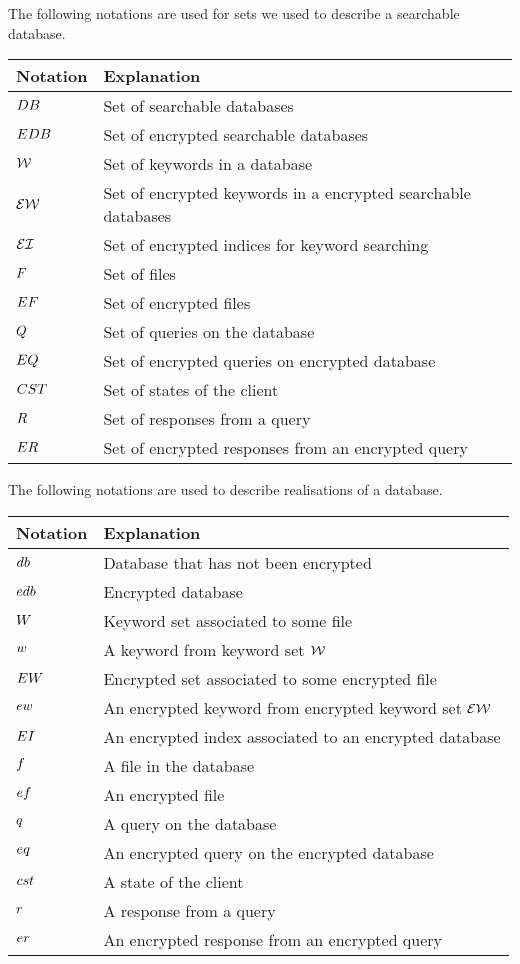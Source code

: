 The following notations are used for sets we used to describe a searchable database.
\begin{table}[H]
	\centering
	\begin{tabular}{ll}
		\textbf{Notation} & \textbf{Explanation} \\ \hline
		$DB$     	  	  & Set of searchable databases \\
		$EDB$    		  & Set of encrypted searchable databases \\
		$\mathcal{W}$		  & Set of keywords in a database \\
		$\mathcal{EW}$		  & Set of encrypted keywords in a encrypted searchable databases \\
		$\mathcal{EI}$		  & Set of encrypted indices for keyword searching \\
		$F$			  & Set of files \\
		$EF$		  & Set of encrypted files \\
		$Q$		  & Set of queries on the database \\
		$EQ$		  & Set of encrypted queries on encrypted database \\
		$CST$		  & Set of states of the client \\
		$R$		  & Set of responses from a query \\
		$ER$	  & Set of encrypted responses from an encrypted query
	\end{tabular}
\end{table}


The following notations are used to describe realisations of a database.
\begin{table}[H]
	\centering
	\begin{tabular}{ll}
		\textbf{Notation} & \textbf{Explanation} \\ \hline
		$db$     	  	  & Database that has not been encrypted \\
		$edb$    		  & Encrypted database \\
		$W$		  & Keyword set associated to some file \\
		$w$			  & A keyword from keyword set $\mathcal{W}$ \\
		$EW$		  & Encrypted set associated to some encrypted file \\
		$ew$			  & An encrypted keyword from encrypted keyword set $\mathcal{EW}$ \\
		$EI$		  & An encrypted index associated to an encrypted database \\
		$f$			  & A file in the database \\
		$ef$		  & An encrypted file \\
		$q$		  & A query on the database \\
		$eq$		  & An encrypted query on the encrypted database \\
		$cst$		  & A state of the client \\
		$r$		  & A response from a query \\
		$er$	  & An encrypted response from an encrypted query
	\end{tabular}
\end{table}

